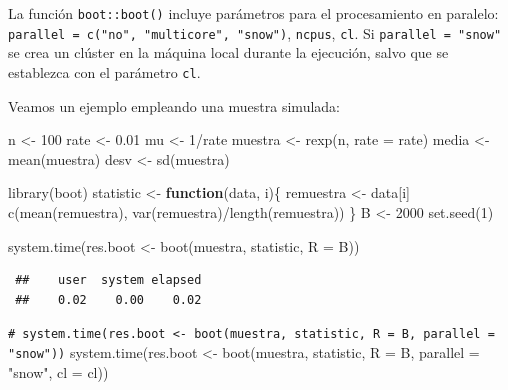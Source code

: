 \documentclass[
]{book}
\newenvironment{Shaded}{\begin{snugshade}}{\end{snugshade}}
\newcommand{\AttributeTok}[1]{\textcolor[rgb]{0.77,0.63,0.00}{#1}}
\newcommand{\CommentTok}[1]{\textcolor[rgb]{0.56,0.35,0.01}{\textit{#1}}}
\newcommand{\ControlFlowTok}[1]{\textcolor[rgb]{0.13,0.29,0.53}{\textbf{#1}}}
\newcommand{\DecValTok}[1]{\textcolor[rgb]{0.00,0.00,0.81}{#1}}
\newcommand{\FloatTok}[1]{\textcolor[rgb]{0.00,0.00,0.81}{#1}}
\newcommand{\FunctionTok}[1]{\textcolor[rgb]{0.00,0.00,0.00}{#1}}
\newcommand{\NormalTok}[1]{#1}
\newcommand{\OtherTok}[1]{\textcolor[rgb]{0.56,0.35,0.01}{#1}}
\newcommand{\SpecialCharTok}[1]{\textcolor[rgb]{0.00,0.00,0.00}{#1}}
\newcommand{\StringTok}[1]{\textcolor[rgb]{0.31,0.60,0.02}{#1}}
\theoremstyle{break}
\theoremstyle{nonumberplain}
\renewcommand{\CommentTok}[1]{\textcolor[rgb]{0.41,0.41,0.41}{\texttt{#1}}}
\begin{document}
La función \texttt{boot::boot()} incluye parámetros para el procesamiento en paralelo:
\texttt{parallel\ =\ c("no",\ "multicore",\ "snow")}, \texttt{ncpus}, \texttt{cl}.
Si \texttt{parallel\ =\ "snow"} se crea un clúster en la máquina local durante la ejecución, salvo que se establezca con el parámetro \texttt{cl}.

Veamos un ejemplo empleando una muestra simulada:

\begin{Shaded}
\begin{Highlighting}[]
\NormalTok{n }\OtherTok{\textless{}{-}} \DecValTok{100}
\NormalTok{rate }\OtherTok{\textless{}{-}} \FloatTok{0.01}
\NormalTok{mu }\OtherTok{\textless{}{-}} \DecValTok{1}\SpecialCharTok{/}\NormalTok{rate}
\NormalTok{muestra }\OtherTok{\textless{}{-}} \FunctionTok{rexp}\NormalTok{(n, }\AttributeTok{rate =}\NormalTok{ rate)}
\NormalTok{media }\OtherTok{\textless{}{-}} \FunctionTok{mean}\NormalTok{(muestra)}
\NormalTok{desv }\OtherTok{\textless{}{-}} \FunctionTok{sd}\NormalTok{(muestra)}

\FunctionTok{library}\NormalTok{(boot)}
\NormalTok{statistic }\OtherTok{\textless{}{-}} \ControlFlowTok{function}\NormalTok{(data, i)\{}
\NormalTok{  remuestra }\OtherTok{\textless{}{-}}\NormalTok{ data[i]}
  \FunctionTok{c}\NormalTok{(}\FunctionTok{mean}\NormalTok{(remuestra), }\FunctionTok{var}\NormalTok{(remuestra)}\SpecialCharTok{/}\FunctionTok{length}\NormalTok{(remuestra))}
\NormalTok{\}}
\NormalTok{B }\OtherTok{\textless{}{-}} \DecValTok{2000}
\FunctionTok{set.seed}\NormalTok{(}\DecValTok{1}\NormalTok{)}

\FunctionTok{system.time}\NormalTok{(res.boot }\OtherTok{\textless{}{-}} \FunctionTok{boot}\NormalTok{(muestra, statistic, }\AttributeTok{R =}\NormalTok{ B))}
\end{Highlighting}
\end{Shaded}

\begin{verbatim}
 ##    user  system elapsed 
 ##    0.02    0.00    0.02
\end{verbatim}

\begin{Shaded}
\begin{Highlighting}[]
\CommentTok{\# system.time(res.boot \textless{}{-} boot(muestra, statistic, R = B, parallel = "snow"))}
\FunctionTok{system.time}\NormalTok{(res.boot }\OtherTok{\textless{}{-}} \FunctionTok{boot}\NormalTok{(muestra, statistic, }\AttributeTok{R =}\NormalTok{ B, }\AttributeTok{parallel =} \StringTok{"snow"}\NormalTok{, }\AttributeTok{cl =}\NormalTok{ cl))}
\end{Highlighting}
\end{Shaded}
\end{document}
